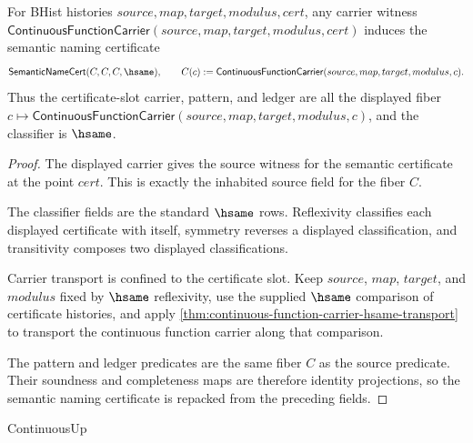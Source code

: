 \begin{theorem}
\label{thm:continuous-function-carrier-certificate-semantic-namecert}
For BHist histories $source,map,target,modulus,cert$, any carrier witness
$\mathsf{ContinuousFunctionCarrier}(source,map,target,modulus,cert)$ induces
the semantic naming certificate
$$
\mathsf{SemanticNameCert}(C,C,C,\hsame),
\qquad
C(c) :=
\mathsf{ContinuousFunctionCarrier}(source,map,target,modulus,c).
$$
Thus the certificate-slot carrier, pattern, and ledger are all the displayed
fiber $c\mapsto\mathsf{ContinuousFunctionCarrier}(source,map,target,modulus,c)$,
and the classifier is $\hsame$.
\end{theorem}
\begin{proof}
The displayed carrier gives the source witness for the semantic certificate at
the point $cert$. This is exactly the inhabited source field for the fiber $C$.

The classifier fields are the standard $\hsame$ rows. Reflexivity classifies
each displayed certificate with itself, symmetry reverses a displayed
classification, and transitivity composes two displayed classifications.

Carrier transport is confined to the certificate slot. Keep $source$, $map$,
$target$, and $modulus$ fixed by $\hsame$ reflexivity, use the supplied
$\hsame$ comparison of certificate histories, and apply
\autoref{thm:continuous-function-carrier-hsame-transport} to transport the
continuous function carrier along that comparison.

The pattern and ledger predicates are the same fiber $C$ as the source
predicate. Their soundness and completeness maps are therefore identity
projections, so the semantic naming certificate is repacked from the preceding
fields.
\end{proof}

\begin{closurestatus}{ContinuousUp}
  \theoryclosure{\scopedClosure}
  \formalstatus{\theoremCheckedV}
\end{closurestatus}
